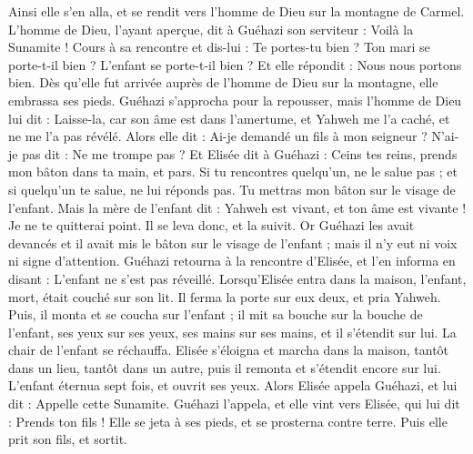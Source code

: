 \begin{multicols}{2}
Ainsi elle s’en alla, et se rendit vers l’homme de Dieu sur la montagne de Carmel. L’homme de Dieu, l’ayant aperçue, dit à Guéhazi son serviteur : Voilà la Sunamite !
Cours à sa rencontre et dis-lui : Te portes-tu bien ? Ton mari se porte-t-il bien ? L’enfant se porte-t-il bien ? Et elle répondit : Nous nous portons bien.
Dès qu’elle fut arrivée auprès de l’homme de Dieu sur la montagne, elle embrassa ses pieds. Guéhazi s’approcha pour la repousser, mais l’homme de Dieu lui dit : Laisse-la, car son âme est dans l’amertume, et Yahweh me l’a caché, et ne me l’a pas révélé.
Alors elle dit : Ai-je demandé un fils à mon seigneur ? N’ai-je pas dit : Ne me trompe pas ?
Et Elisée dit à Guéhazi : Ceins tes reins, prends mon bâton dans ta main, et pars. Si tu rencontres quelqu’un, ne le salue pas ; et si quelqu’un te salue, ne lui réponds pas. Tu mettras mon bâton sur le visage de l’enfant.
Mais la mère de l’enfant dit : Yahweh est vivant, et ton âme est vivante ! Je ne te quitterai point. Il se leva donc, et la suivit.
Or Guéhazi les avait devancés et il avait mis le bâton sur le visage de l’enfant ; mais il n’y eut ni voix ni signe d’attention. Guéhazi retourna à la rencontre d’Elisée, et l’en informa en disant : L’enfant ne s’est pas réveillé.
Lorsqu’Elisée entra dans la maison, l’enfant, mort, était couché sur son lit.
Il ferma la porte sur eux deux, et pria Yahweh.
Puis, il monta et se coucha sur l’enfant ; il mit sa bouche sur la bouche de l’enfant, ses yeux sur ses yeux, ses mains sur ses mains, et il s’étendit sur lui. La chair de l’enfant se réchauffa.
Elisée s’éloigna et marcha dans la maison, tantôt dans un lieu, tantôt dans un autre, puis il remonta et s’étendit encore sur lui. L’enfant éternua sept fois, et ouvrit ses yeux.
Alors Elisée appela Guéhazi, et lui dit : Appelle cette Sunamite. Guéhazi l’appela, et elle vint vers Elisée, qui lui dit : Prends ton fils !
Elle se jeta à ses pieds, et se prosterna contre terre. Puis elle prit son fils, et sortit.

\end{multicols}
